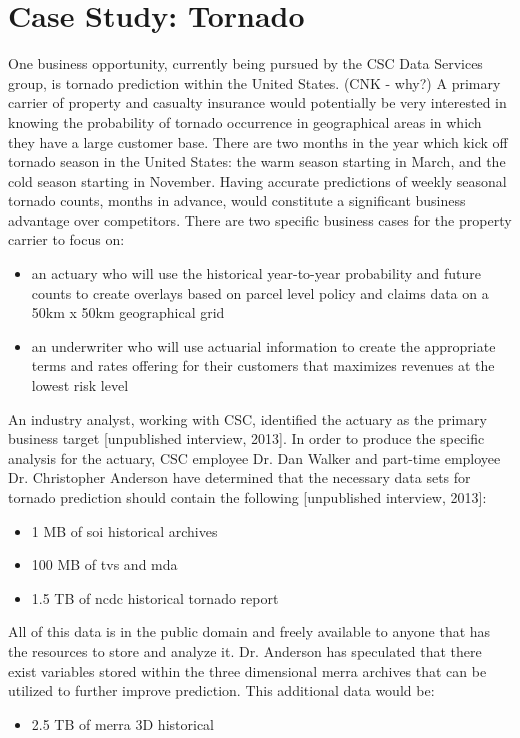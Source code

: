 \section{Case Study: Tornado}
One business opportunity, currently being pursued by the \textsc{CSC} Data Services group, is tornado prediction within the United States. (CNK - why?) A primary carrier of property and casualty insurance would potentially be very interested in knowing the probability of tornado occurrence in geographical areas in which they have a large customer base. There are two months in the year which kick off tornado season in the United States: the warm season starting in March, and the cold season starting in November. Having accurate predictions of weekly seasonal tornado counts, months in advance, would constitute a significant business advantage over competitors. There are two specific business cases for the property carrier to focus on:
\begin{itemize}
    \item an actuary who will use the historical year-to-year probability and future counts to create overlays based on parcel level policy and claims data on a 50km x 50km geographical grid
    \item an underwriter who will use actuarial information to create the appropriate terms and rates offering for their customers that maximizes revenues at the lowest risk level
\end{itemize}
An industry analyst, working with \textsc{CSC}, identified the actuary as the primary business target [unpublished interview, 2013]. In order to produce the specific analysis for the actuary, \textsc{CSC} employee Dr. Dan Walker and part-time employee Dr. Christopher Anderson have determined that the necessary data sets for tornado prediction should contain the following [unpublished interview, 2013]:
\begin{itemize}
    \item 1 MB of \gls{soi} historical archives \cite{bom}
    \item 100 MB of \gls{tvs} and \gls{mda} \cite{hdss}
    \item 1.5 TB of \gls{ncdc} historical tornado report \cite{ncdc}
\end{itemize}
All of this data is in the public domain and freely available to anyone that has the resources to store and analyze it. Dr. Anderson has speculated that there exist variables stored within the three dimensional \gls{merra} archives that can be utilized to further improve prediction. This additional data would be:
\begin{itemize}
    \item 2.5 TB of \gls{merra} 3D historical \cite{mdisc}
\end{itemize}
